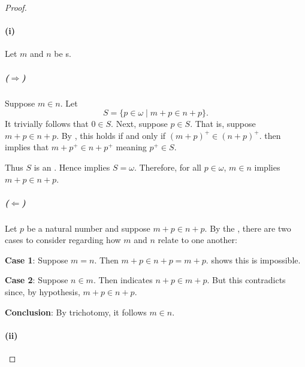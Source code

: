 \documentclass{report}
\begin{document}
  \begin{proof}

    \paragraph{(i)}%

      Let $m$ and $n$ be s.

      \subparagraph{($\Rightarrow$)}%

        Suppose $m \in n$.
        Let $$S = \{p \in \omega \mid m + p \in n + p\}.$$
        It trivially follows that $0 \in S$.
        Next, suppose $p \in S$.
        That is, suppose $m + p \in n + p$.
        By , this holds if and only if
          $(m + p)^+ \in (n + p)^+$.
         then implies that $m + p^+ \in n + p^+$ meaning
          $p^+ \in S$.

        Thus $S$ is an .
        Hence  implies $S = \omega$.
        Therefore, for all $p \in \omega$, $m \in n$ implies $m + p \in n + p$.

      \subparagraph{($\Leftarrow$)}%

        Let $p$ be a natural number and suppose $m + p \in n + p$.
        By the , there are two
          cases to consider regarding how $m$ and $n$ relate to one another:

        \vspace{8pt}
        \textbf{Case 1}: Suppose $m = n$.
        Then $m + p \in n + p = m + p$.
         shows this is impossible.

        \vspace{8pt}
        \textbf{Case 2}: Suppose $n \in m$.
        Then  indicates $n + p \in m + p$.
        But this contradicts  since,
          by hypothesis, $m + p \in n + p$.

        \vspace{8pt}
        \textbf{Conclusion}: By trichotomy, it follows $m \in n$.

    \paragraph{(ii)}%


\end{proof}
\end{document}
